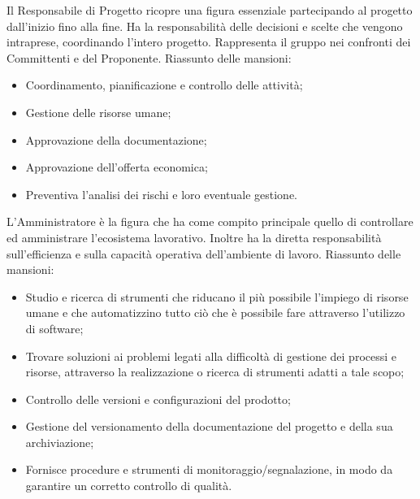 			Il Responsabile di Progetto ricopre una figura essenziale partecipando al progetto dall'inizio fino alla fine. Ha la responsabilità delle decisioni e scelte che vengono intraprese, coordinando l'intero progetto. Rappresenta il gruppo nei confronti dei Committenti e del Proponente.
			Riassunto delle mansioni:
			\begin{itemize}
				\item Coordinamento, pianificazione e controllo delle attività;
				\item Gestione delle risorse umane;
				\item Approvazione della documentazione;
				\item Approvazione dell'offerta economica;
				\item Preventiva l'analisi dei rischi e loro eventuale gestione.
			\end{itemize}
			
			L'Amministratore è la figura che ha come compito principale quello di controllare ed amministrare l'ecosistema lavorativo. Inoltre ha la diretta responsabilità sull'efficienza e sulla capacità operativa dell'ambiente di lavoro.
			Riassunto delle mansioni:
			\begin{itemize}
				\item Studio e ricerca di strumenti che riducano il più possibile l'impiego di risorse umane e che automatizzino tutto ciò che è possibile fare attraverso l'utilizzo di software;
				\item Trovare soluzioni ai problemi legati alla difficoltà di gestione dei processi e risorse, attraverso la realizzazione o ricerca di strumenti adatti a tale scopo;
				\item Controllo delle versioni e configurazioni del prodotto;
				\item Gestione del versionamento della documentazione del progetto e della sua archiviazione;
				\item Fornisce procedure e strumenti di monitoraggio/segnalazione, in modo da garantire un corretto controllo di qualità.
			\end{itemize}
		
